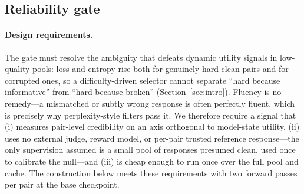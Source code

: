 \subsection{Reliability gate}
\label{sec:reliability-gate}

\paragraph{Design requirements.}
The gate must resolve the ambiguity that defeats dynamic utility
signals in low-quality pools: loss and entropy rise both for
genuinely hard clean pairs and for corrupted ones, so a
difficulty-driven selector cannot separate ``hard because
informative'' from ``hard because broken''
(Section~\ref{sec:intro}). Fluency is no remedy---a mismatched or
subtly wrong response is often perfectly fluent, which is precisely
why perplexity-style filters pass it. We therefore require a signal
that (i) measures pair-level credibility on an axis orthogonal to
model-state utility, (ii) uses no external judge, reward model, or
per-pair trusted reference response---the only supervision assumed
is a small pool of responses presumed clean, used once to calibrate
the null---and (iii) is cheap enough to run once over the full pool
and cache. The construction below meets these
requirements with two forward passes per pair at the base
checkpoint.

